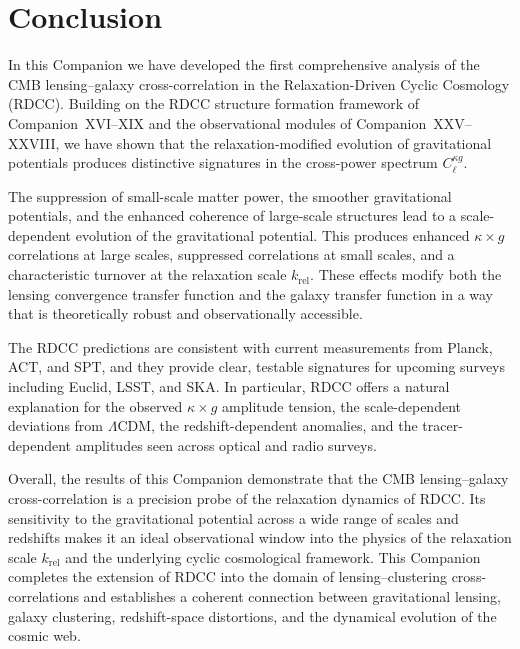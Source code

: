 \documentclass[11pt,a4paper]{article}
\begin{document}
\section{Conclusion}

In this Companion we have developed the first comprehensive analysis of the CMB 
lensing–galaxy cross-correlation in the Relaxation-Driven Cyclic Cosmology (RDCC). Building 
on the RDCC structure formation framework of Companion~XVI–XIX and the observational modules 
of Companion~XXV–XXVIII, we have shown that the relaxation-modified evolution of 
gravitational potentials produces distinctive signatures in the cross-power spectrum 
$C_{\ell}^{\kappa g}$.

The suppression of small-scale matter power, the smoother gravitational potentials, and the 
enhanced coherence of large-scale structures lead to a scale-dependent evolution of the 
gravitational potential. This produces enhanced $\kappa \times g$ correlations at large 
scales, suppressed correlations at small scales, and a characteristic turnover at the 
relaxation scale $k_{\mathrm{rel}}$. These effects modify both the lensing convergence 
transfer function and the galaxy transfer function in a way that is theoretically robust and 
observationally accessible.

The RDCC predictions are consistent with current measurements from Planck, ACT, and SPT, and 
they provide clear, testable signatures for upcoming surveys including Euclid, LSST, and 
SKA. In particular, RDCC offers a natural explanation for the observed $\kappa \times g$ 
amplitude tension, the scale-dependent deviations from $\Lambda$CDM, the redshift-dependent 
anomalies, and the tracer-dependent amplitudes seen across optical and radio surveys.

Overall, the results of this Companion demonstrate that the CMB lensing–galaxy 
cross-correlation is a precision probe of the relaxation dynamics of RDCC. Its sensitivity 
to the gravitational potential across a wide range of scales and redshifts makes it an ideal 
observational window into the physics of the relaxation scale $k_{\mathrm{rel}}$ and the 
underlying cyclic cosmological framework. This Companion completes the extension of RDCC 
into the domain of lensing–clustering cross-correlations and establishes a coherent 
connection between gravitational lensing, galaxy clustering, redshift-space distortions, and 
the dynamical evolution of the cosmic web.

\end{document}
